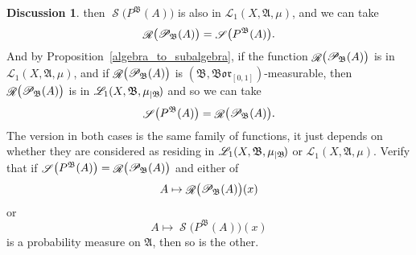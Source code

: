 \documentclass[
twoside=true,
paper=letter,
fontsize=9pt,
pagesize=auto,
leqno,
openany,
headsepline,
overfullrule,
]{scrbook}
\theoremstyle{plain}
\theoremstyle{plain}
\theoremstyle{definition}
\newtheorem{discussion}[thm]{Discussion}
\theoremstyle{bfnoteitalic}
\theoremstyle{bfnoteroman}
\newcommand{\sigalg}[1]{\mathfrak{#1}}
\newcommand{\cali}[1]{\mathscr{#1}}
\newcommand{\condprobop}[1]{\mathop{\cali{P}\hspace{-1pt}}\nolimits_{#1}}
\newcommand{\borel}{\mathfrak{Bor}}
\newcommand{\restrictedto}[1]{_{\lvert#1}\kern-1.5pt}
\newcommand{\sigmaalgebra}{\sigalg{A}}
\newcommand{\sigmaalgebraii}{\sigalg{B}}
\newcommand{\caliLone}{\cali{L}_1(\measurespace, \sigmaalgebra, \measure)}
\newcommand{\measurespace}{X}
\newcommand{\measure}{\mu}
\newcommand{\seti}{A}
\newcommand{\regular}{\mathop{\cali{R}}}
\newcommand{\selection}{\mathop{\cali{S}}}
\begin{document}
\begin{discussion}
then
$\selection \bigl( P^\sigmaalgebraii(\seti) \bigr)$
is also in
$\cali{L}_1(\measurespace, \sigmaalgebra,\measure)$,
and we can take
\[
\regular\bigl( \condprobop{\sigmaalgebraii}(\seti)\bigr)
=
\selection \bigl( P^\sigmaalgebraii(\seti) \bigr).
\]
And by Proposition~\ref{algebra_to_subalgebra}, if the function
$\regular\bigl( \condprobop{\sigmaalgebraii}(\seti)\bigr)$
is in
$\cali{L}_1(\measurespace, \sigmaalgebra,\measure)$, and if
$\regular\bigl( \condprobop{\sigmaalgebraii}(\seti)\bigr)$
is $(\sigmaalgebraii,\borel_{[0,1]})$\hyp{}measurable,
then
$\regular\bigl( \condprobop{\sigmaalgebraii}(\seti)\bigr)$
is in
$\cali{L}_1(\measurespace, \sigmaalgebraii,\measure\restrictedto{\sigmaalgebraii})$
and so we can take
\[
\selection \bigl( P^\sigmaalgebraii(\seti) \bigr)
=
\regular\bigl( \condprobop{\sigmaalgebraii}(\seti)\bigr).
\]
The version in both cases is the same family of functions, it just depends on whether they are considered as residing in
$\cali{L}_1(\measurespace, \sigmaalgebraii,\measure\restrictedto{\sigmaalgebraii})$
or
$\caliLone$.
Verify that if
$\selection \bigl( P^\sigmaalgebraii(\seti) \bigr)
=
\regular\bigl( \condprobop{\sigmaalgebraii}(\seti)\bigr)$
and either of
\[
\seti\mapsto \regular\bigl( \condprobop{\sigmaalgebraii}(\seti)\bigr)(x)
\]
or
\[
\seti\mapsto \selection \bigl( P^\sigmaalgebraii(\seti) \bigr)(x)
\]
is a probability measure on $\sigmaalgebra$, then so is the other.
\end{discussion}
\end{document}
